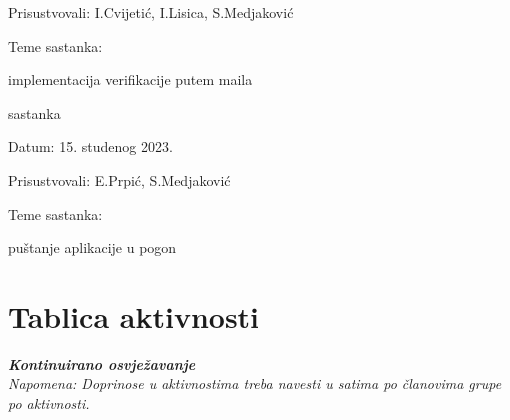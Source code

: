 \begin{packed_enum}
\begin{packed_item}
				\item Prisustvovali: I.Cvijetić, I.Lisica, S.Medjaković
				\item Teme sastanka:
				\begin{packed_item}
					\item implementacija verifikacije putem maila
				\end{packed_item}
			\end{packed_item}
			\item  sastanka
			\item[] \begin{packed_item}
				\item Datum: 15. studenog 2023.
				\item Prisustvovali: E.Prpić, S.Medjaković
				\item Teme sastanka:
				\begin{packed_item}
					\item  puštanje aplikacije u pogon
				\end{packed_item}
			\end{packed_item}
			
		\end{packed_enum}
		
		
		
		\eject
		\section*{Tablica aktivnosti}
		
			\textbf{\textit{Kontinuirano osvježavanje}}\\
			
			 \textit{Napomena: Doprinose u aktivnostima treba navesti u satima po članovima grupe po aktivnosti.}


